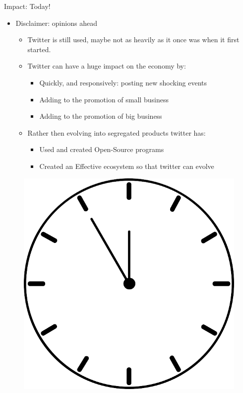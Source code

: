 \documentclass[xcolor=svgnames,handout]{beamer}
\begin{document}
\begin{frame}{Impact: Today!}
	\begin{itemize}
	\item Disclaimer: opinions ahead
		\begin{itemize}
			\item Twitter is still used, maybe not as heavily as it once was when it first started.
			\item Twitter can have a huge impact on the economy by:
				\begin{itemize}
					\item Quickly, and responsively: posting new shocking events
					\item Adding to the promotion of small business
					\item Adding to the promotion of big business
				\end{itemize}
			\item Rather then evolving into segregated products twitter has:
				\begin{itemize}
					\item Used and created Open-Source programs~\cite{twitter}~\cite{twitter2013}~\cite{twittergithub2013}~\cite{twitterwebarchive22013}
					\item Created an Effective ecosystem so that twitter can evolve
				\end{itemize}
		\end{itemize}
	\end{itemize}
	\begin{figure}[h]
		\centering
		\includegraphics[scale=0.10]{clock.png}
		\caption{~\cite{clkerfreevectorimagesUnknown}}
	\end{figure}
\end{frame}
\end{document}
